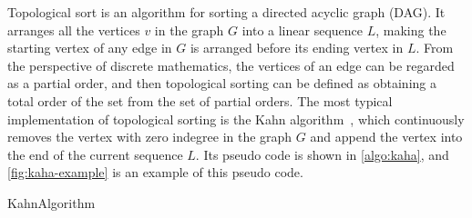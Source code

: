 Topological sort is an algorithm for sorting a directed acyclic graph (DAG).
It arranges all the vertices $v$ in the graph $G$ into a linear sequence $L$, making the starting vertex of any edge in $G$ is arranged before its ending vertex in $L$.
From the perspective of discrete mathematics, the vertices of an edge can be regarded as a partial order, and then topological sorting can be defined as obtaining a total order of the set from the set of partial orders.
The most typical implementation of topological sorting is the Kahn algorithm~\cite{kahn1962topological}, which continuously removes the vertex with zero indegree in the graph $G$ and append the vertex into the end of the current sequence $L$.
Its pseudo code is shown in \autoref{algo:kaha}, and \autoref{fig:kaha-example} is an example of this pseudo code.

  \begin{algorithm}[H]
    \caption{KahnAlgorithm}
    \label{algo:kaha}
    
  \end{algorithm}

